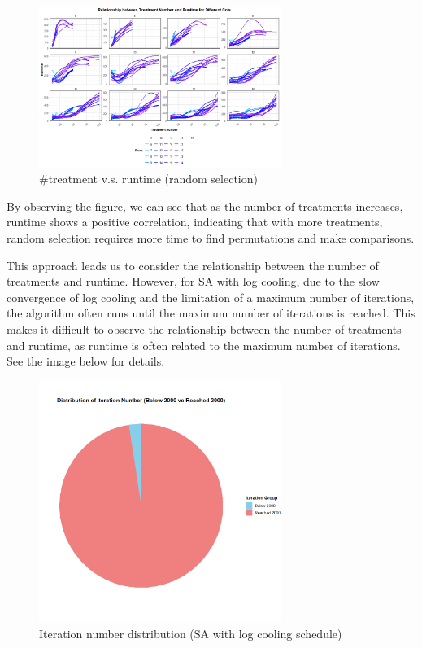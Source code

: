 \documentclass[
  a4paper,
  oneside,
  openany,
  12pt,
  onecolumn]{book}
\theoremstyle{definition}
\theoremstyle{plain}
\theoremstyle{remark}
\begin{document}
\begin{figure}[H]

{\centering \includegraphics[width=0.7\textwidth,height=\textheight]{images/Rplots/RS_eva/RS-trt-vs-runtime.png}

}

\caption{\#treatment v.s. runtime (random selection)}

\end{figure}%

By observing the figure, we can see that as the number of treatments
increases, runtime shows a positive correlation, indicating that with
more treatments, random selection requires more time to find
permutations and make comparisons.

This approach leads us to consider the relationship between the number
of treatments and runtime. However, for SA with log cooling, due to the
slow convergence of log cooling and the limitation of a maximum number
of iterations, the algorithm often runs until the maximum number of
iterations is reached. This makes it difficult to observe the
relationship between the number of treatments and runtime, as runtime is
often related to the maximum number of iterations. See the image below
for details.

\begin{figure}[H]

{\centering \includegraphics[width=0.7\textwidth,height=\textheight]{images/Rplots/SA-Slow-eva/SA-Slow-iternum-distribution.png}

}

\caption{Iteration number distribution (SA with log cooling schedule)}

\end{figure}%
\end{document}
